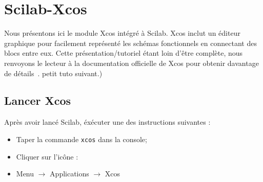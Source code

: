 \section{Scilab-Xcos}
Nous présentons ici le module Xcos intégré à Scilab. Xcos inclut un 
éditeur graphique pour facilement représenté les schémas fonctionnels
en connectant des blocs entre eux. Cette présentation/tutoriel étant loin 
d'être complète, nous renvoyons le lecteur à la documentation officielle de Xcos
pour obtenir davantage de détails~\cite{steer2014scilab,premier,xcos}. 
petit tuto suivant.)

\subsection{Lancer Xcos}
Après avoir lancé Scilab, éxécuter une des instructions suivantes :
\begin{itemize}
    \item Taper la commande \verb?xcos? dans la console;
    \item Cliquer sur l'icône : 
    \item Menu $\rightarrow$ Applications $\rightarrow$ Xcos
\end{itemize}

